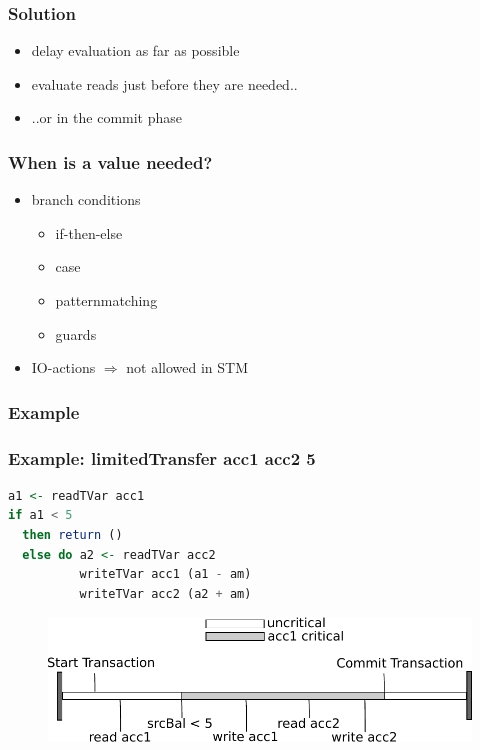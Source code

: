 \documentclass{beamer}
\begin{document}

  \begin{frame}
   \frametitle{Solution}
   \begin{itemize}\setlength\itemsep{1em}
    \item delay evaluation as far as possible
    \item evaluate reads just before they are needed..
    \item ..or in the commit phase
   \end{itemize}
  \end{frame}


  \begin{frame}
   \frametitle{When is a value needed?}
   \begin{itemize}\setlength\itemsep{1em}
    \item branch conditions
       \begin{itemize}
        \item if-then-else
        \item case
        \item patternmatching
        \item guards
       \end{itemize}
    \item IO-actions $\Rightarrow$ not allowed in STM
   \end{itemize}
  \end{frame}
  
  \begin{frame}
    \frametitle{Example}
       
  \end{frame}
  
  \begin{frame}[fragile]
   \frametitle{Example: limitedTransfer acc1 acc2 5}
   \begin{lstlisting}[language=Haskell]
a1 <- readTVar acc1
if a1 < 5
  then return ()
  else do a2 <- readTVar acc2
          writeTVar acc1 (a1 - am)
          writeTVar acc2 (a2 + am)
   \end{lstlisting}
   \pause
   \begin{figure}
    \includegraphics[scale=0.7]{ressources/lessCriticalValue.pdf}
   \end{figure}
\end{frame}
  
\end{document}
